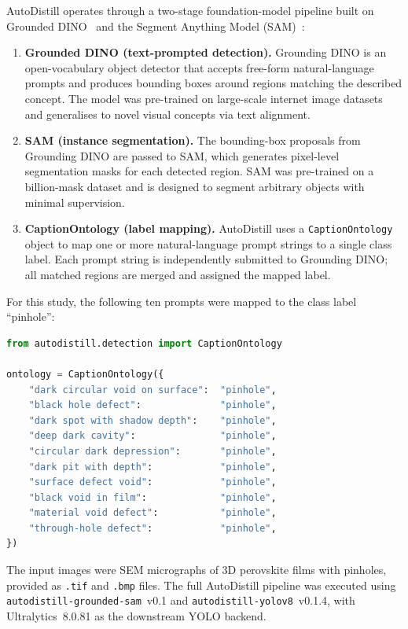 \documentclass[pdflatex,sn-mathphys-num,iicol]{sn-jnl}
\theoremstyle{thmstyleone}
\theoremstyle{thmstyletwo}
\theoremstyle{thmstylethree}
\begin{document}
AutoDistill operates through a two-stage foundation-model pipeline
built on Grounded DINO~\cite{liu2023groundingdino} and the Segment
Anything Model (SAM)~\cite{kirillov2023sam}:

\begin{enumerate}
\item \textbf{Grounded DINO (text-prompted detection).}
  Grounding DINO is an open-vocabulary object detector that accepts
  free-form natural-language prompts and produces bounding boxes around
  regions matching the described concept. The model was pre-trained on
  large-scale internet image datasets and generalises to novel visual
  concepts via text alignment.
\item \textbf{SAM (instance segmentation).}
  The bounding-box proposals from Grounding DINO are passed to SAM,
  which generates pixel-level segmentation masks for each detected
  region. SAM was pre-trained on a billion-mask dataset and is designed
  to segment arbitrary objects with minimal supervision.
\item \textbf{CaptionOntology (label mapping).}
  AutoDistill uses a \texttt{CaptionOntology} object to map one or more
  natural-language prompt strings to a single class label. Each prompt
  string is independently submitted to Grounding DINO; all matched
  regions are merged and assigned the mapped label.
\end{enumerate}

For this study, the following ten prompts were mapped to the class
label ``pinhole'':

\begin{lstlisting}[language=Python,
caption={AutoDistill CaptionOntology used for zero-shot pinhole annotation},
label={lst:autodistill}]
from autodistill.detection import CaptionOntology

ontology = CaptionOntology({
    "dark circular void on surface":  "pinhole",
    "black hole defect":              "pinhole",
    "dark spot with shadow depth":    "pinhole",
    "deep dark cavity":               "pinhole",
    "circular dark depression":       "pinhole",
    "dark pit with depth":            "pinhole",
    "surface defect void":            "pinhole",
    "black void in film":             "pinhole",
    "material void defect":           "pinhole",
    "through-hole defect":            "pinhole",
})
\end{lstlisting}

The input images were SEM micrographs of 3D perovskite films with
pinholes, provided as \texttt{.tif} and \texttt{.bmp} files. The full
AutoDistill pipeline was executed using
\texttt{autodistill-grounded-sam}~v0.1 and
\texttt{autodistill-yolov8}~v0.1.4, with Ultralytics~8.0.81 as the
downstream YOLO backend.
\end{document}
